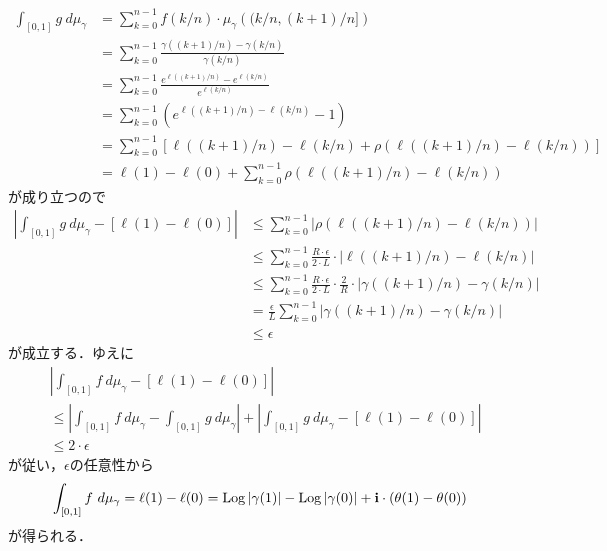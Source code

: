\begin{sketch}
\begin{description}
\begin{align}
					\int_{[0,1]} g\ d\mu_{\gamma}
					&= \sum_{k=0}^{n-1} f(k/n) \cdot \mu_{\gamma}\left((k/n,(k+1)/n]\right) \\
					&= \sum_{k=0}^{n-1} \frac{\gamma((k+1)/n) - \gamma(k/n)}{\gamma(k/n)} \\
					&= \sum_{k=0}^{n-1} \frac{e^{\ell((k+1)/n)} - e^{\ell(k/n)}}{e^{\ell(k/n)}} \\
					&= \sum_{k=0}^{n-1} \left(e^{\ell((k+1)/n) - \ell(k/n)} - 1\right) \\
					&= \sum_{k=0}^{n-1} \left[\ell((k+1)/n) - \ell(k/n) + \rho\left(\ell((k+1)/n) - \ell(k/n)\right)\right] \\
					&= \ell(1) - \ell(0) + \sum_{k=0}^{n-1} \rho\left(\ell((k+1)/n) - \ell(k/n)\right)
				\end{align}
				が成り立つので
				\begin{align}
					\left|\int_{[0,1]} g\ d\mu_{\gamma} - [\ell(1) - \ell(0)]\right|
					&\leq \sum_{k=0}^{n-1} \left|\rho\left(\ell((k+1)/n) - \ell(k/n)\right)\right| \\
					&\leq \sum_{k=0}^{n-1} \frac{R \cdot \epsilon}{2 \cdot L} \cdot |\ell((k+1)/n) - \ell(k/n)| \\
					&\leq \sum_{k=0}^{n-1} \frac{R \cdot \epsilon}{2 \cdot L} \cdot \frac{2}{R} \cdot |\gamma((k+1)/n) - \gamma(k/n)| \\
					&= \frac{\epsilon}{L} \sum_{k=0}^{n-1} |\gamma((k+1)/n) - \gamma(k/n)| \\
					&\leq \epsilon
				\end{align}
				が成立する．ゆえに
				\begin{align}
					&\left|\int_{[0,1]} f\ d\mu_{\gamma} - [\ell(1) - \ell(0)]\right| \\
					&\leq \left|\int_{[0,1]} f\ d\mu_{\gamma} - \int_{[0,1]} g\ d\mu_{\gamma}\right|
					+ \left|\int_{[0,1]} g\ d\mu_{\gamma} - [\ell(1) - \ell(0)]\right| \\
					&\leq 2 \cdot \epsilon
				\end{align}
				が従い，$\epsilon$の任意性から
				\begin{align}
					\int_{[0,1]} f\ d\mu_{\gamma} = \ell(1) - \ell(0)
					= \operatorname{Log}{|\gamma(1)|} - \operatorname{Log}{|\gamma(0)|} + \mathbf{i} \cdot \left(\theta(1) - \theta(0)\right)
				\end{align}
				が得られる．
				

\end{description}
\end{sketch}
